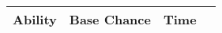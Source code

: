 \documentclass[a4paper]{article}
\begin{document}
\begin{table*}[h]
\begin{center}
\begin{tabular}{|l|l|l|l|} \hline
\textbf{Ability}	& \textbf{Base Chance}	& \textbf{Time} \\ \hline
\end{tabular}
\end{center}
\end{table*}
\end{document}
